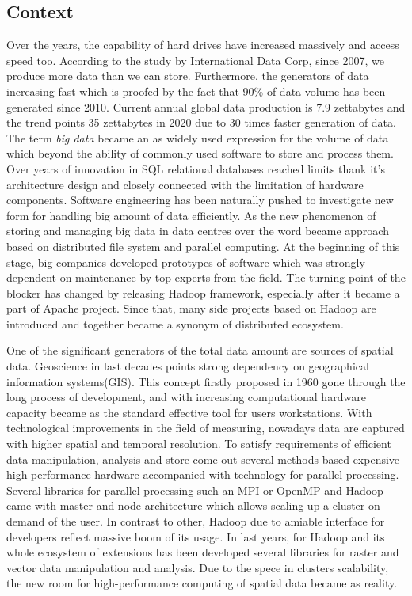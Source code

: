 \documentclass[a4paper,12pt,oneside]{report}
\begin{document}
\subsection*{Context}
Over the years, the capability of hard drives have increased massively and access speed too. According to the study by International Data Corp, since 2007, we produce more data than we can store. Furthermore, the generators of data  increasing fast which is proofed by the fact that 90\% of data volume has been generated since 2010. Current  annual global data production is  7.9 zettabytes and the trend points 35 zettabytes in 2020 due to 30 times faster generation of data.  
The term \textit{big data} became an as widely used expression for the volume of data which beyond the ability of commonly used software to store and process  them.   Over years of innovation in SQL relational databases reached limits thank it's architecture design and closely connected with the limitation of hardware components.  Software engineering has been naturally pushed to  investigate new form for handling big amount of data efficiently.  As  the new phenomenon   of storing and managing big data in data centres over the word became approach based on distributed file system and parallel computing. At the beginning of this stage, big companies developed prototypes of software which was strongly dependent on maintenance by top experts from the field.  The turning point of the blocker has changed by releasing  Hadoop framework, especially after it became a part of Apache project. Since that, many side projects based on Hadoop are introduced and together became a synonym of  distributed ecosystem.


One of the significant generators of the total data amount are sources of spatial data.   Geoscience in last decades points strong dependency on geographical information systems(GIS). This concept firstly proposed in 1960 gone through  the long process of development, and with increasing computational hardware capacity became as the standard  effective tool for users workstations. With technological improvements in the field of measuring, nowadays data are captured with higher spatial and temporal resolution. To satisfy requirements of efficient data manipulation, analysis and store come out several methods based expensive high-performance hardware accompanied with technology for parallel processing. Several libraries for parallel processing such an MPI or OpenMP and Hadoop came with master and node  architecture which allows scaling up a cluster on demand of the user. In contrast to other, Hadoop due to amiable interface for developers reflect massive boom of its usage. In last years, for Hadoop and its whole ecosystem of extensions has been developed several libraries for raster and vector data manipulation and analysis. Due to the spece in clusters scalability, the new room for high-performance computing of spatial data became as reality.
\end{document}
